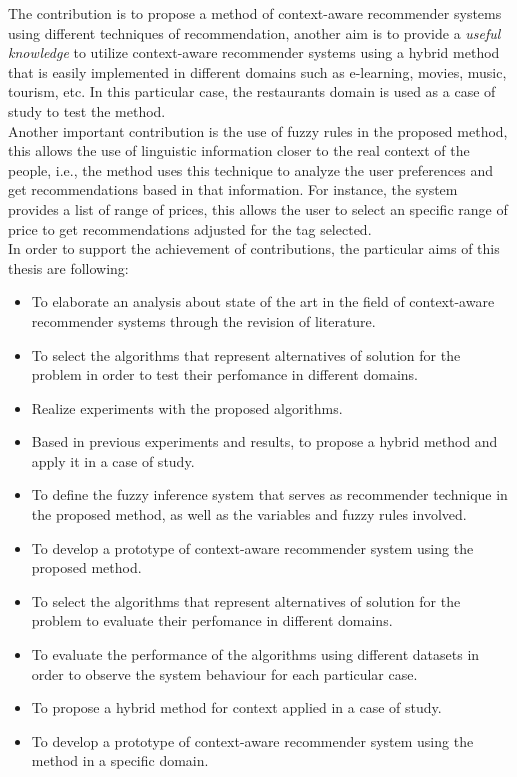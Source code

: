 The contribution is to propose a method of context-aware
recommender systems using different techniques of recommendation,
another aim is to provide a \textit{useful knowledge} to utilize
context-aware recommender systems using a hybrid method that is easily
implemented in different domains such as e-learning, movies, music,
tourism, etc. In this particular case, the restaurants domain is used
as a case of study to test the method. \\
Another important contribution is the use of fuzzy rules in the
proposed method, this allows the use of linguistic information closer
to the real context of the people, i.e., the method uses this
technique to analyze the user preferences and get recommendations
based in that information. For instance, the system provides a list of
range of prices, this allows the user to select an specific range of
price to get recommendations adjusted for the tag selected.\\ In order
to support the achievement of contributions, the particular aims of
this thesis are following:
\begin{itemize}  
\item To elaborate an analysis about state of the art in the field
of context-aware recommender systems through  the revision of
literature. 
\item To select the algorithms that represent alternatives of
solution for the problem in order to test their perfomance in different
domains.
\item Realize experiments with the proposed algorithms.
\item Based in previous experiments and results, to propose a hybrid
method and apply it in a case of study.
\item To define the fuzzy inference system that serves as recommender
technique in the proposed method, as well as the variables and fuzzy
rules involved.
\item To develop a prototype of context-aware recommender system 
using the proposed method.
\item To select the algorithms that represent alternatives of
solution for the problem to evaluate their perfomance in different
domains.
\item To evaluate the performance of the algorithms using 
different datasets in order to observe the system behaviour 
for each particular case.
\item To propose a hybrid method for context applied in a case of
study.
\item To develop a prototype of context-aware recommender system 
using the method in a specific domain.
\end{itemize} 

